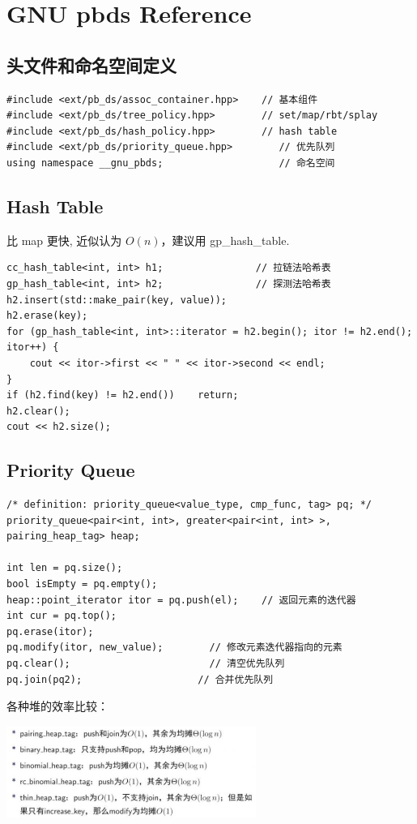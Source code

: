 \section{GNU pbds Reference}
\subsection{头文件和命名空间定义}
\begin{verbatim}
#include <ext/pb_ds/assoc_container.hpp>    // 基本组件
#include <ext/pb_ds/tree_policy.hpp>        // set/map/rbt/splay
#include <ext/pb_ds/hash_policy.hpp>        // hash table
#include <ext/pb_ds/priority_queue.hpp>        // 优先队列
using namespace __gnu_pbds;                    // 命名空间
\end{verbatim}

\subsection{Hash Table}

比 map 更快, 近似认为 $O(n)$，建议用 gp\_hash\_table.

\begin{verbatim}
cc_hash_table<int, int> h1;                // 拉链法哈希表
gp_hash_table<int, int> h2;                // 探测法哈希表
h2.insert(std::make_pair(key, value));
h2.erase(key);
for (gp_hash_table<int, int>::iterator = h2.begin(); itor != h2.end(); itor++) {
    cout << itor->first << " " << itor->second << endl;
}
if (h2.find(key) != h2.end())    return;
h2.clear();
cout << h2.size();
\end{verbatim}

\subsection{Priority Queue}
\begin{verbatim}
/* definition: priority_queue<value_type, cmp_func, tag> pq; */
priority_queue<pair<int, int>, greater<pair<int, int> >, pairing_heap_tag> heap;

int len = pq.size();
bool isEmpty = pq.empty();
heap::point_iterator itor = pq.push(el);    // 返回元素的迭代器
int cur = pq.top();
pq.erase(itor);
pq.modify(itor, new_value);        // 修改元素迭代器指向的元素
pq.clear();                        // 清空优先队列
pq.join(pq2);                    // 合并优先队列
\end{verbatim}

\noindent \par 各种堆的效率比较：
\par \includegraphics[height=3cm]{chapters/ch12-language-and-libs/image/pbds_pq.png}

